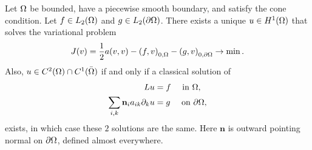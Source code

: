 \begin{thmx}{\quad}
   Let $\Omega$  be bounded, have a piecewise smooth boundary, and satisfy the 
   cone condition. Let $f \in L_2( \Omega)$ and $g\in L_2(\partial \Omega)$.
   There exists a unique $u \in H^1(\Omega)$ that solves the variational problem 
   \begin{equation*}
    J(v) = \frac{1}{2}a(v,v) - {(f,v)}_{0,\Omega} - {(g,v)}_{0,\partial\Omega} \to \min.
   \end{equation*}
   Also, $u \in C^2(\Omega)\cap C^1(\bar{\Omega})$ if and only if a classical solution 
   of 
   \begin{align}
    Lu &= f \quad \text{ in }\Omega, \nonumber \\
    \sum_{i,k}  \mathbf{n}_i a_{ik} \partial_k u &= g \quad \text{ on } \partial \Omega, \label{eq:neuman_condition_boundary}
   \end{align}
   exists, in which case these $2$ solutions are the same. Here $\mathbf{n}$ is outward 
   pointing normal on $\partial \Omega$, defined almost everywhere.
   \end{thmx}
